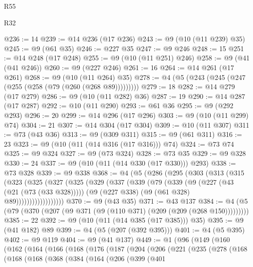 \begin{lexlean}{R55}
\begin{lexlean}{R32}
\begin{coremodule}
{{{{{{{{{{{{{{{{{{{{{{{{{{{{{{{{{{{{{{{{{{{{{{{{{{{@236 := 14
@239 := @14 @236 (@17 @236)
@243 := @9 (@10 (@11 @239) @35)
@245 := @9 (@61 @35)
@246 := @227 @35
@247 := @9 @246
@248 := 15
@251 := @14 @248 (@17 @248)
@255 := @9 (@10 (@11 @251) @246)
@258 := @9 (@41 (@41 @246))
@260 := @9 (@227 @246)
@261 := 16
@264 := @14 @261 (@17 @261)
@268 := @9 (@10 (@11 @264) @35)
@278 := @4 (@5 (@243 (@245 (@247 (@255 (@258 (@79 (@260 (@268 @89)))))))))
@279 := 18
@282 := @14 @279 (@17 @279)
@286 := @9 (@10 (@11 @282) @36)
@287 := 19
@290 := @14 @287 (@17 @287)
@292 := @10 (@11 @290)
@293 := @61 @36
@295 := @9 (@292 @293)
@296 := 20
@299 := @14 @296 (@17 @296)
@303 := @9 (@10 (@11 @299) @74)
@304 := 21
@307 := @14 @304 (@17 @304)
@309 := @10 (@11 @307)
@311 := @73 (@43 @36)
@313 := @9 (@309 @311)
@315 := @9 (@61 @311)
@316 := 23
@323 := @9 (@10 (@11 (@14 @316 (@17 @316))) @74)
@324 := @73 @74
@325 := @9 @324
@327 := @9 (@73 @324)
@328 := @73 @35
@329 := @9 @328
@330 := 24
@337 := @9 (@10 (@11 (@14 @330 (@17 @330))) @293)
@338 := @73 @328
@339 := @9 @338
@368 := @4
    (@5
      (@286
        (@295
          (@303
            (@313
              (@315
                (@323
                  (@325
                    (@327
                      (@325
                        (@329
                          (@337
                            (@339
                              (@79
                                (@339
                                  (@9
                                    (@227 (@43 (@21 (@73 (@33 @328)))))
                                    (@9 (@227 @338) (@9 (@61 @328) @89))))))))))))))))))
@370 := @9 (@43 @35)
@371 := @43 @137
@384 := @4 (@5 (@79 (@370 (@207 (@9 @371 (@9 (@110 @371) (@209 (@209 (@268 @150)))))))))
@385 := 22
@392 := @9 (@10 (@11 (@14 @385 (@17 @385))) @35)
@395 := @9 (@41 @182) @89
@399 := @4 (@5 (@207 (@392 @395)))
@401 := @4 (@5 @395)
@402 := @9 @119
@404 := @9 (@41 @137)
@449 := @1
    (@96
      (@149
        (@160
          (@162
            (@164
              (@166
                (@168
                  (@176
                    (@187
                      (@204
                        (@206
                          (@221
                            (@235
                              (@278
                                (@168
                                  (@168
                                    (@168
                                      (@368
                                        (@384
                                          (@164
                                            (@206
                                              (@399
                                                (@401
}}}}}}}}}}}}}}}}}}}}}}}}}}}}}}}}}}}}}}}}}}}}}}}}}}}
\end{coremodule}
\end{lexlean}
\end{lexlean}
